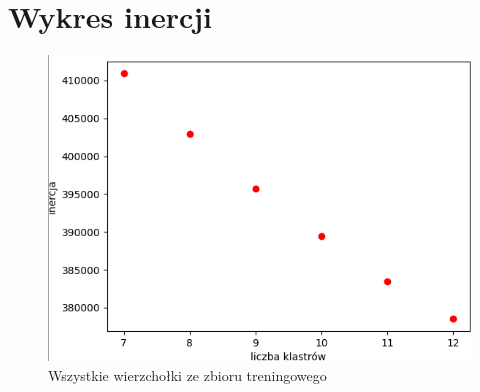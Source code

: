 \documentclass[a4paper,14pt]{report}
\begin{document}
\section{Wykres inercji}
	\begin{figure}[H]
	      \includegraphics[scale=1.0]{klastry}
	      \centering
	      \caption{Wszystkie wierzchołki ze zbioru treningowego}
	    \end{figure}
\end{document}
